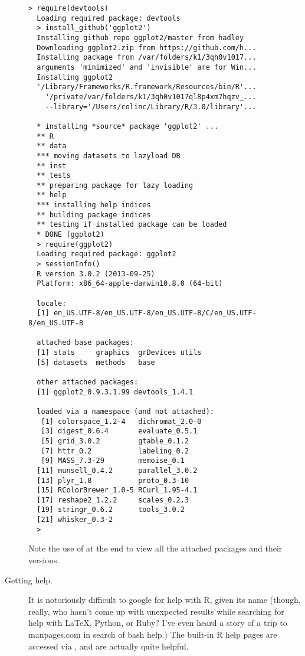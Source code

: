 \documentclass[12pt]{article}
\newcommand{\code}[1]{\Colorbox{code}{\texttt{\footnotesize #1}}}
\newcommand{\R}[1]{\Colorbox{code}{\texttt{\footnotesize> #1}}}
\begin{document}
\begin{description}
  \begin{lstlisting}[style=bash]
  > require(devtools)
  Loading required package: devtools
  > install_github('ggplot2')
  Installing github repo ggplot2/master from hadley
  Downloading ggplot2.zip from https://github.com/h...
  Installing package from /var/folders/k1/3qh0v1017...
  arguments 'minimized' and 'invisible' are for Win...
  Installing ggplot2
  '/Library/Frameworks/R.framework/Resources/bin/R'...
    '/private/var/folders/k1/3qh0v1017ql8p4xm7hqzv_...
    --library='/Users/colinc/Library/R/3.0/library'...

  * installing *source* package 'ggplot2' ...
  ** R
  ** data
  *** moving datasets to lazyload DB
  ** inst
  ** tests
  ** preparing package for lazy loading
  ** help
  *** installing help indices
  ** building package indices
  ** testing if installed package can be loaded
  * DONE (ggplot2)
  > require(ggplot2)
  Loading required package: ggplot2
  > sessionInfo()
  R version 3.0.2 (2013-09-25)
  Platform: x86_64-apple-darwin10.8.0 (64-bit)

  locale:
  [1] en_US.UTF-8/en_US.UTF-8/en_US.UTF-8/C/en_US.UTF-8/en_US.UTF-8

  attached base packages:
  [1] stats     graphics  grDevices utils    
  [5] datasets  methods   base     

  other attached packages:
  [1] ggplot2_0.9.3.1.99 devtools_1.4.1    

  loaded via a namespace (and not attached):
   [1] colorspace_1.2-4   dichromat_2.0-0   
   [3] digest_0.6.4       evaluate_0.5.1    
   [5] grid_3.0.2         gtable_0.1.2      
   [7] httr_0.2           labeling_0.2      
   [9] MASS_7.3-29        memoise_0.1       
  [11] munsell_0.4.2      parallel_3.0.2    
  [13] plyr_1.8           proto_0.3-10      
  [15] RColorBrewer_1.0-5 RCurl_1.95-4.1    
  [17] reshape2_1.2.2     scales_0.2.3      
  [19] stringr_0.6.2      tools_3.0.2       
  [21] whisker_0.3-2     
  > 
  \end{lstlisting}
  Note the use of \R{sessionInfo()} at the end to view all the attached
  packages and their versions.


\item[Getting help.] It is notoriously difficult to google for help with 
  R, given its name (though, really, who hasn't come up with unexpected 
  results while searching for help with \LaTeX, Python, or Ruby?  I've even
  heard a story of a trip to manpages.com in search of bash help.) The built-in
  R help pages are accessed via \code{?}, and are actually quite helpful.


\end{description}
\end{document}
